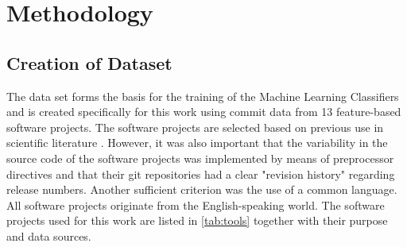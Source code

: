 
\section{Methodology}

\subsection{Creation of Dataset}

The data set forms the basis for the training of the Machine Learning Classifiers and is created specifically for this work using commit data from 13 feature-based software projects. The software projects are selected based on previous use in scientific literature \cite{Hunsen2015,Liebig2010,Queiroz2015,Queiroz2016}. However, it was also important that the variability in the source code of the software projects was implemented by means of preprocessor directives and that their git repositories had a clear "revision history" regarding release numbers. Another sufficient criterion was the use of a common language. All software projects originate from the English-speaking world. The software projects used for this work are listed in \autoref{tab:tools} together with their purpose and data sources.

\begin{table}[ht]
\centering
\caption{Used software projects}
\label{tab:tools}
\end{table}

